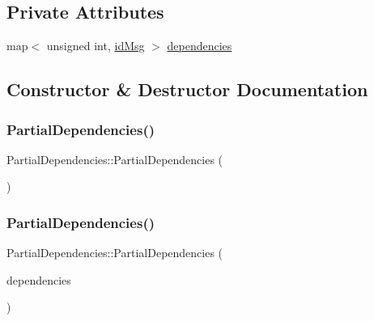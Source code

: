 \subsection*{Private Attributes}
\begin{DoxyCompactItemize}
\item 
map$<$ unsigned int, \hyperlink{structures_8h_a83a1d9a070efa5341da84cfd8e28d3e5}{id\+Msg} $>$ \hyperlink{class_partial_dependencies_a4b72531ce3a3b7c4b6f02d0fe8ea1a7c}{dependencies}
\end{DoxyCompactItemize}


\subsection{Constructor \& Destructor Documentation}
\mbox{\label{class_partial_dependencies_aefb05dec194a9ab63482df6645cbd842}} 
\subsubsection{\texorpdfstring{Partial\+Dependencies()}{PartialDependencies()}\hspace{0.1cm}{\footnotesize\ttfamily [1/2]}}
{\footnotesize\ttfamily Partial\+Dependencies\+::\+Partial\+Dependencies (\begin{DoxyParamCaption}{ }\end{DoxyParamCaption})}

\mbox{\label{class_partial_dependencies_a1f17aad6d01c7e8cdc40bf99138eb528}} 
\subsubsection{\texorpdfstring{Partial\+Dependencies()}{PartialDependencies()}\hspace{0.1cm}{\footnotesize\ttfamily [2/2]}}
{\footnotesize\ttfamily Partial\+Dependencies\+::\+Partial\+Dependencies (\begin{DoxyParamCaption}\item[{const map$<$ unsigned int, \hyperlink{structures_8h_a83a1d9a070efa5341da84cfd8e28d3e5}{id\+Msg} $>$ \&}]{dependencies }\end{DoxyParamCaption})}

